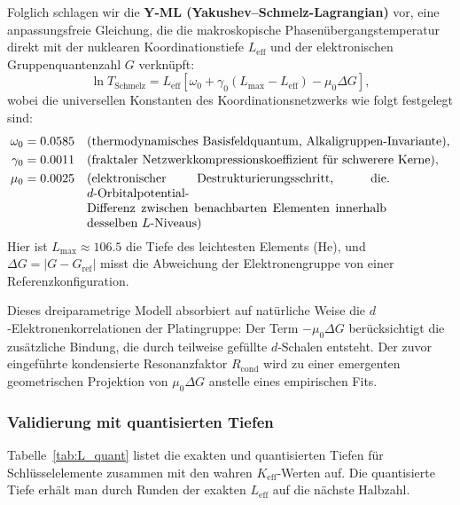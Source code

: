 \documentclass[12pt,a4paper]{article}
\theoremstyle{remark}
\begin{document}
	Folglich schlagen wir die \textbf{Y-ML (Yakushev–Schmelz-Lagrangian)} vor, eine anpassungsfreie Gleichung, die die makroskopische Phasenübergangstemperatur direkt mit der nuklearen Koordinationstiefe \(L_{\mathrm{eff}}\) und der elektronischen Gruppenquantenzahl \(G\) verknüpft:
	\begin{equation}
		\boxed{\ln T_{\mathrm{Schmelz}} = L_{\mathrm{eff}} \left[ \omega_0 + \gamma_0 (L_{\mathrm{max}} - L_{\mathrm{eff}}) - \mu_0 \Delta G \right]},
		\label{eq:YML}
	\end{equation}
	wobei die universellen Konstanten des Koordinationsnetzwerks wie folgt festgelegt sind:
	\begin{align}
		\omega_0 &= 0.0585 \quad \text{(thermodynamisches Basisfeldquantum, Alkaligruppen-Invariante)},\\
		\gamma_0 &= 0.0011 \quad \text{(fraktaler Netzwerkkompressionskoeffizient für schwerere Kerne)},\\
		\mu_0   &= 0.0025 \quad 
		\parbox[t]{0.7\textwidth}{%
			(elektronischer Destrukturierungsschritt, die $d$‑Orbitalpotential-\\
			Differenz zwischen benachbarten Elementen innerhalb desselben $L$‑Niveaus)}.
	\end{align}
	Hier ist \(L_{\mathrm{max}} \approx 106.5\) die Tiefe des leichtesten Elements (He), und \(\Delta G = |G - G_{\text{ref}}|\) misst die Abweichung der Elektronengruppe von einer Referenzkonfiguration.
	
	Dieses dreiparametrige Modell absorbiert auf natürliche Weise die $d$‑Elektronenkorrelationen der Platingruppe: Der Term \(-\mu_0 \Delta G\) berücksichtigt die zusätzliche Bindung, die durch teilweise gefüllte $d$‑Schalen entsteht. Der zuvor eingeführte kondensierte Resonanzfaktor \(R_{\text{cond}}\) wird zu einer emergenten geometrischen Projektion von \(\mu_0 \Delta G\) anstelle eines empirischen Fits.
	
	\subsubsection{Validierung mit quantisierten Tiefen}
	Tabelle~\ref{tab:L_quant} listet die exakten und quantisierten Tiefen für Schlüsselelemente zusammen mit den wahren \(K_{\mathrm{eff}}\)-Werten auf. Die quantisierte Tiefe erhält man durch Runden der exakten \(L_{\mathrm{eff}}\) auf die nächste Halbzahl.
	
\end{document}
